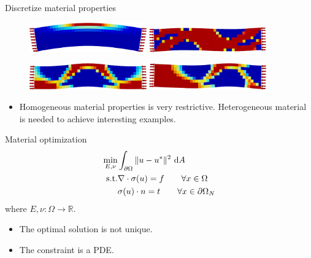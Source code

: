 \begin{frame}{Discretize material properties}
\begin{figure}
\hspace{\fill}
\includegraphics[width=0.45\textwidth]{Images/material_opt_half_period.png}
\hspace{\fill}
\includegraphics[width=0.45\textwidth]{Images/material_opt_full_period.png}
\hspace{\fill}

\vspace{3mm}
\hspace{\fill}
\includegraphics[width=0.45\textwidth]{Images/material_opt_bump_half.png}
\hspace{\fill}
\includegraphics[width=0.45\textwidth]{Images/material_opt_bump_third.png}
\hspace{\fill}
\end{figure}

\begin{itemize}
\item Homogeneous material properties is very restrictive.
Heterogeneous material is needed to achieve interesting examples.
\end{itemize}
\end{frame}

\begin{frame}{Material optimization}
\begin{align*}
\min_{E, \nu} & \int_{\partial \Omega} \|u - u^*\|^2 \, \, \mathrm{d}A\\
\textrm{s.t.} & \nabla \cdot \sigma(u) = f \qquad \forall x \in \Omega\\
& \sigma(u) \cdot n = t \qquad \forall x \in \partial \Omega_{N}
\end{align*}
where $E,\nu : \Omega \to \mathbb{R}$.

\begin{itemize}
\pause \item The optimal solution is not unique.
\pause \item The constraint is a PDE.
\end{itemize}
\end{frame}


